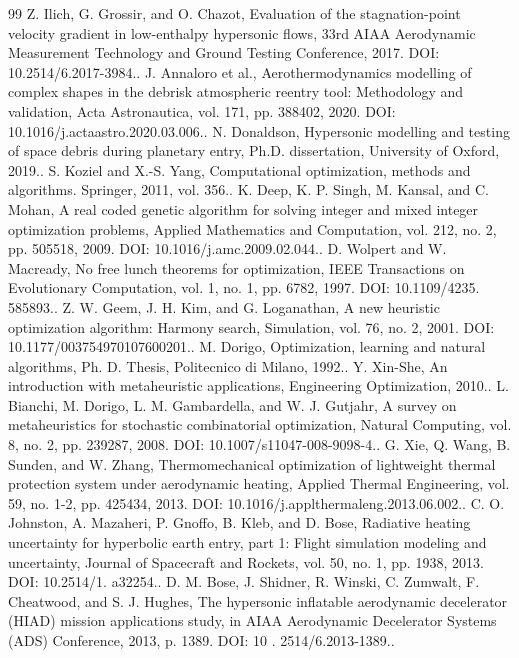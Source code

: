 \documentclass[conference]{IEEEtran}
\begin{document}
\begin{sloppypar}
\begin{thebibliography}{99}
 Z. Ilich, G. Grossir, and O. Chazot, Evaluation of the stagnation-point velocity gradient in low-enthalpy hypersonic flows, 33rd AIAA Aerodynamic Measurement Technology and Ground Testing Conference, 2017. DOI: 10.2514/6.2017-3984..
 J. Annaloro et al., Aerothermodynamics modelling of complex shapes in the debrisk atmospheric reentry tool: Methodology and validation, Acta Astronautica, vol. 171, pp. 388402, 2020. DOI: 10.1016/j.actaastro.2020.03.006..
 N. Donaldson, Hypersonic modelling and testing of space debris during planetary entry, Ph.D. dissertation, University of Oxford, 2019..
 S. Koziel and X.-S. Yang, Computational optimization, methods and algorithms. Springer, 2011, vol. 356..
 K. Deep, K. P. Singh, M. Kansal, and C. Mohan, A real coded genetic algorithm for solving integer and mixed integer optimization problems, Applied Mathematics and Computation, vol. 212, no. 2, pp. 505518, 2009. DOI: 10.1016/j.amc.2009.02.044..
 D. Wolpert and W. Macready, No free lunch theorems for optimization, IEEE Transactions on Evolutionary Computation, vol. 1, no. 1, pp. 6782, 1997. DOI: 10.1109/4235. 585893..
 Z. W. Geem, J. H. Kim, and G. Loganathan, A new heuristic optimization algorithm: Harmony search, Simulation, vol. 76, no. 2, 2001. DOI: 10.1177/003754970107600201..
 M. Dorigo, Optimization, learning and natural algorithms, Ph. D. Thesis, Politecnico di Milano, 1992..
 Y. Xin-She, An introduction with metaheuristic applications, Engineering Optimization, 2010..
 L. Bianchi, M. Dorigo, L. M. Gambardella, and W. J. Gutjahr, A survey on metaheuristics for stochastic combinatorial optimization, Natural Computing, vol. 8, no. 2, pp. 239287, 2008. DOI: 10.1007/s11047-008-9098-4..
 G. Xie, Q. Wang, B. Sunden, and W. Zhang, Thermomechanical optimization of lightweight thermal protection system under aerodynamic heating, Applied Thermal Engineering, vol. 59, no. 1-2, pp. 425434, 2013. DOI: 10.1016/j.applthermaleng.2013.06.002..
 C. O. Johnston, A. Mazaheri, P. Gnoffo, B. Kleb, and D. Bose, Radiative heating uncertainty for hyperbolic earth entry, part 1: Flight simulation modeling and uncertainty, Journal of Spacecraft and Rockets, vol. 50, no. 1, pp. 1938, 2013. DOI: 10.2514/1. a32254..
 D. M. Bose, J. Shidner, R. Winski, C. Zumwalt, F. Cheatwood, and S. J. Hughes, The hypersonic inflatable aerodynamic decelerator (HIAD) mission applications study, in AIAA Aerodynamic Decelerator Systems (ADS) Conference, 2013, p. 1389. DOI: 10 . 2514/6.2013-1389..

\end{thebibliography}
\end{sloppypar}
\end{document}
